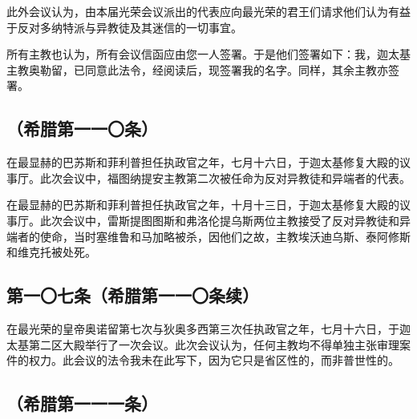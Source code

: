 此外会议认为，由本届光荣会议派出的代表应向最光荣的君王们请求他们认为有益于反对多纳特派与异教徒及其迷信的一切事宜。\par

所有主教也认为，所有会议信函应由您一人签署。于是他们签署如下：我，迦太基主教奥勒留，已同意此法令，经阅读后，现签署我的名字。同样，其余主教亦签署。\par


\subsection{（希腊第一一〇条）}

\par

在最显赫的巴苏斯和菲利普担任执政官之年，七月十六日，于迦太基修复大殿的议事厅。此次会议中，福图纳提安主教第二次被任命为反对异教徒和异端者的代表。\par

\par

在最显赫的巴苏斯和菲利普担任执政官之年，十月十三日，于迦太基修复大殿的议事厅。此次会议中，雷斯提图图斯和弗洛伦提乌斯两位主教接受了反对异教徒和异端者的使命，当时塞维鲁和马加略被杀，因他们之故，主教埃沃迪乌斯、泰阿修斯和维克托被处死。\par


\subsection{第一〇七条（希腊第一一〇条续）}

\par

在最光荣的皇帝奥诺留第七次与狄奥多西第三次任执政官之年，七月十六日，于迦太基第二区大殿举行了一次会议。此次会议认为，任何主教均不得单独主张审理案件的权力。此会议的法令我未在此写下，因为它只是省区性的，而非普世性的。\par


\subsection{（希腊第一一一条）}

